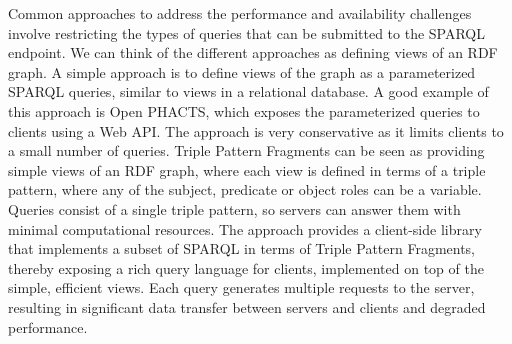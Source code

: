 Common approaches to address the performance and availability challenges involve restricting the types of queries that can be submitted to the SPARQL endpoint.
We can think of the different approaches as defining views of an RDF graph.
A simple approach is to define views of the graph as a parameterized SPARQL queries, similar to views in a relational database.
A good example of this approach is Open PHACTS, which exposes the parameterized queries to clients using a Web API.
The approach is very conservative as it limits clients to a small number of queries.
%
Triple Pattern Fragments \cite{Verborgh2014} can be seen as providing simple views of an RDF graph, where each view is defined in terms of a triple pattern, where any of the subject, predicate or object roles can be a variable.
Queries consist of a single triple pattern, so servers can answer them with minimal computational resources.
The approach provides a client-side library that implements a subset of SPARQL in terms of Triple Pattern Fragments, thereby exposing a rich query language for clients, implemented on top of the simple, efficient views.
Each query generates multiple requests to the server, resulting in significant data transfer between servers and clients and degraded performance. 

